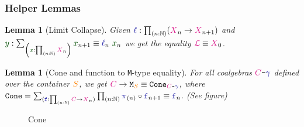 \documentclass[xelatex,mathserif,serif,notheorems]{beamer} %
\theoremstyle{plain} %
\newtheorem{lem}[thm]{Lemma}
\theoremstyle{definition}
\theoremstyle{remark}
\newcommand*{\term}[1]{\textcolor{green!30!black}{#1}} %
\newcommand*{\type}[1]{\textcolor{magenta!90!black}{#1}}
\newcommand*{\container}[1]{\textcolor{orange}{#1}}
\newcommand*{\coalg}[2]{#1\texttt{-}#2}
\newcommand*{\function}[1]{\textcolor{blue!60!black}{\ensuremath{\mathtt{#1}}}}
\newcommand*{\typeformer}[1]{\ensuremath{\mathtt{#1}}}
\newcommand{\setlengths}{
  \setlength{\abovedisplayskip}{4pt}
  \setlength{\belowdisplayskip}{4pt}
  \setlength{\abovedisplayshortskip}{2pt}
  \setlength{\belowdisplayshortskip}{2pt}
}
\begin{document}
\begin{frame}[fragile]
  \frametitle{Helper Lemmas}
  \begin{lem}[Limit Collapse]\setlengths
    \label{lem:limit-collapse}
    Given \(\function{\ell} : \prod_{(n : \mathbb{N})} (\type{X}_{n} \rightarrow \type{X}_{n+1})\) and \(\term{y} : \sum_{\left(\term{x} : \prod_{(n : \mathbb{N})} \type{X}_n\right)} \term{x}_{n + 1} \equiv \function{\ell}_n~\term{x}_n\) we get the equality \(\type{\mathcal{L}} \equiv \type{X}_0\).
  \end{lem}
  \begin{lem}[Cone and function to \texttt{M}-type equality]\setlengths
    \label{lem:function-to-M-type-is-cone}
    For all coalgebras \(\coalg{\type{C}}{\function{\gamma}}\) defined over the container \(\container{S}\), we get \(\type{C} \rightarrow \typeformer{M}_{\container{S}} \equiv \typeformer{Cone}_{\coalg{\type{C}}{\function{\gamma}}}\), where \(\typeformer{Cone} = \sum_{(\function{f} : \prod_{(n : \mathbb{N})} \type{C} \rightarrow \type{X}_n)} \prod_{(n : \mathbb{N})} \function{\pi}_{(n)} \circ \function{f}_{n+1} \equiv \function{f}_n\). (See figure)
  \end{lem}
  \begin{figure}[h]
    \centering
    \caption{Cone}
    \label{fig:M-seq-cone}
  \end{figure}
\end{frame}
\end{document}
